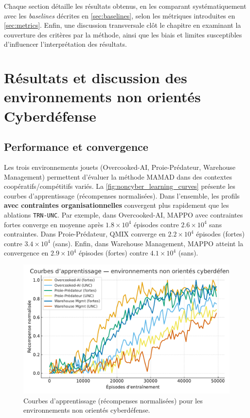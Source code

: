 Chaque section détaille les résultats obtenus, en les comparant systématiquement avec les \textit{baselines} décrites en \autoref{sec:baselines}, selon les métriques introduites en \autoref{sec:metrics}.
Enfin, une discussion transversale clôt le chapitre en examinant la couverture des critères par la méthode, ainsi que les biais et limites susceptibles d’influencer l’interprétation des résultats.

\section{Résultats et discussion des environnements non orientés Cyberdéfense}\label{sec:results_and_discussion_cyberdefense}

\subsection*{Performance et convergence}

Les trois environnements jouets (Overcooked-AI, Proie-Prédateur, Warehouse Management) permettent d’évaluer la méthode MAMAD dans des contextes coopératifs/compétitifs variés.
La \autoref{fig:noncyber_learning_curves} présente les courbes d’apprentissage (récompenses normalisées).
Dans l’ensemble, les profils \textbf{avec contraintes organisationnelles} convergent plus rapidement que les ablations \texttt{TRN-UNC}.
Par exemple, dans Overcooked-AI, MAPPO avec contraintes fortes converge en moyenne après $1.8\times 10^4$ épisodes contre $2.6\times 10^4$ sans contraintes.
Dans Proie-Prédateur, QMIX converge en $2.2\times 10^4$ épisodes (fortes) contre $3.4\times 10^4$ (sans).
Enfin, dans Warehouse Management, MAPPO atteint la convergence en $2.9\times 10^4$ épisodes (fortes) contre $4.1\times 10^4$ (sans).

\begin{figure}[h!]
  \centering
  \includegraphics[width=0.75\linewidth]{figures/results_noncyber_learning.pdf}
  \caption{Courbes d’apprentissage (récompenses normalisées) pour les environnements non orientés cyberdéfense.}
  \label{fig:noncyber_learning_curves}
\end{figure}

